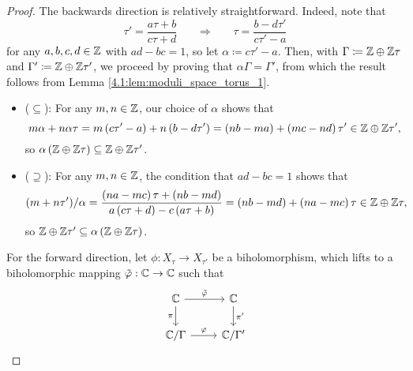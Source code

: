 \documentclass[../Moduli_Spaces_of_Riemann_Surfaces.tex]{subfiles}
\begin{document}
    \begin{proof}
        The backwards direction is relatively straightforward. Indeed, note that
        \begin{equation*}
            \tau'=\frac{a\tau+b}{c\tau+d}\ \ \ \ \ \ \ \ \Rightarrow\ \ \ \ \ \ \ \ \tau=\frac{b-d\tau'}{c\tau'-a}
        \end{equation*}
        for any $a,b,c,d\in\mathbb{Z}$ with $ad-bc=1$, so let $\alpha\coloneqq c\tau'-a$. Then, with $\Gamma\coloneqq\mathbb{Z}\oplus\mathbb{Z}\tau$ and $\Gamma'\coloneqq\mathbb{Z}\oplus\mathbb{Z}\tau'$, we proceed by proving that $\alpha\Gamma=\Gamma'$, from which the result follows from Lemma \ref{4.1:lem:moduli_space_torus_1}.
        \begin{itemize}
            \item ($\subseteq$): For any $m,n\in\mathbb{Z}$, our choice of $\alpha$ shows that
                \begin{equation*}
                    m\alpha+n\alpha\tau=m\left(c\tau'-a\right)+n\left(b-d\tau'\right)=\left(nb-ma\right)+\left(mc-nd\right)\tau'\in\mathbb{Z}\oplus\mathbb{Z}\tau',
                \end{equation*}
                so $\alpha\left(\mathbb{Z}\oplus\mathbb{Z}\tau\right)\subseteq\mathbb{Z}\oplus\mathbb{Z}\tau'$.
            \item ($\supseteq$): For any $m,n\in\mathbb{Z}$, the condition that $ad-bc=1$ shows that
                \begin{equation*}
                    \left(m+n\tau'\right)\!/\alpha=\frac{\left(na-mc\right)\tau+\left(nb-md\right)}{a\left(c\tau+d\right)-c\left(a\tau+b\right)}=\left(nb-md\right)+\left(na-mc\right)\tau\in\mathbb{Z}\oplus\mathbb{Z}\tau,
                \end{equation*}
                so $\mathbb{Z}\oplus\mathbb{Z}\tau'\subseteq\alpha\left(\mathbb{Z}\oplus\mathbb{Z}\tau\right)$.
        \end{itemize}
        For the forward direction, let $\phi:X_\tau\to X_{\tau'}$ be a biholomorphism, which lifts to a biholomorphic mapping $\tilde{\varphi}:\mathbb{C}\to\mathbb{C}$ such that
        \begin{equation*}
            \begin{tikzcd}
                \C \ar[r, "\tilde{\phi}"] \ar[d, "\pi"'] & \C \ar[d, "\pi'"] \\
                \C/\Gamma \ar[r, "\phi"] & \C/\Gamma'
            \end{tikzcd}           
        \end{equation*}

\end{proof}
\end{document}
